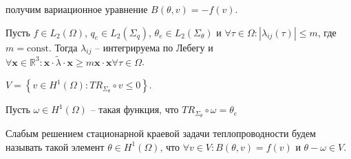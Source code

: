 \documentclass[__main__.tex]{subfiles}
\begin{document}
получим вариационное уравнение $B(\theta,v)=-f(v)$.

Пусть \(f{\in}L_2(\Omega)\), \(q_e{\in}L_2(\Sigma_q)\), \(\theta_e{\in}L_2(\Sigma_\theta)\) и \(\forall\tau\in\Omega\colon\left|\lambda_{ij}(\tau)\right|{\le}m\), где \(m=\mathrm{const}\). Тогда $\lambda_{ij}$ -- интегрируема по Лебегу и \(\forall\symbf{x}\in\mathbb{R}^3\colon\symbf{x}\cdot\tilde{\lambda}\cdot\symbf{x}{\ge}m\symbf{x}\cdot\symbf{x}\forall\tau\in\Omega\).

\(V=\left\{v{\in}H^1(\Omega)\colon{TR}_{\Sigma_\theta}{\circ}v{\le}0\right\}\).

Пусть \(\omega{\in}H^1(\Omega)\) -- такая функция, что \({TR}_{\Sigma_\theta}\circ\omega=\theta_{e}\)

\begin{definition}
	Слабым решением стационарной краевой задачи теплопроводности будем называть такой элемент \(\theta{\in}H^1(\Omega)\), что \({\forall}v{\in}V{\colon}B(\theta,v)=f(v)\) и \(\theta-\omega{\in}V\).
\end{definition}
\end{document}
